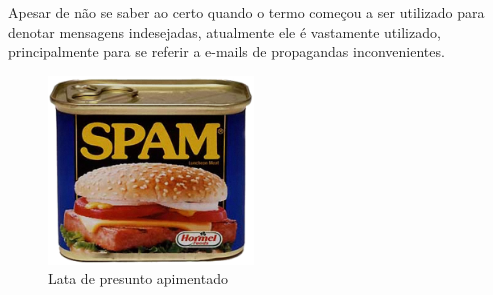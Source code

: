 \documentclass[a4paper,dvipdfm]{article}
\begin{document}
		Apesar de não se saber ao certo quando o termo começou a ser utilizado para denotar mensagens indesejadas, atualmente ele é vastamente utilizado, principalmente para  se referir a e-mails de propagandas inconvenientes.
		
		\begin{figure}[ht]
			\centering
			\includegraphics [height=5cm]{Imagens/spam/spam.png}
			\caption{Lata de presunto apimentado}
			\label{fig:spam}
		\end{figure}
\end{document}
